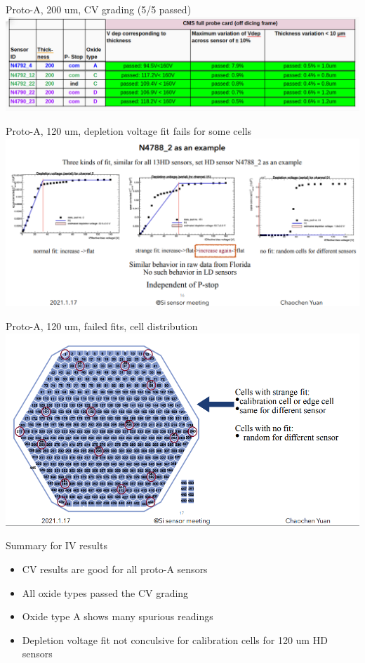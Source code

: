 \documentclass{beamer}
\begin{document}
\begin{frame}{Proto-A, 200 um, CV grading (5/5 passed)}
  \includegraphics[width=.9\textwidth]{plots/CV_grading_200um.png}
\end{frame}

\begin{frame}{Proto-A, 120 um, depletion voltage fit fails for some cells}
  \includegraphics[width=.9\textwidth]{plots/CV_Fit.png}
  \href{https://indico.cern.ch/event/1119831/contributions/4702464/attachments/2378225/4063679/Si\%20sensor\%20meeting.pdf}{}

\end{frame}

\begin{frame}{Proto-A, 120 um, failed fits, cell distribution}
  \includegraphics[width=.9\textwidth]{plots/CV_Fit_Distribution.png}
\end{frame}

\begin{frame}{Summary for IV results}
  \begin{itemize}
      \item CV results are good for all proto-A sensors
      \item All oxide types passed the CV grading
      \item Oxide type A shows many spurious readings
      \item Depletion voltage fit not conculsive for calibration cells for 120 um HD sensors
  \end{itemize}
\end{frame}
\end{document}
